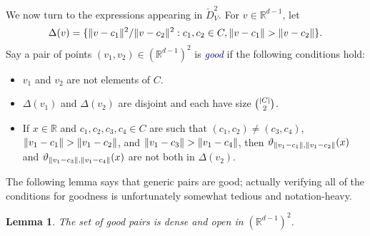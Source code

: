 \documentclass[11pt]{amsart}
\newtheorem{lemma}[theorem]{Lemma}
\theoremstyle{definition}
\DeclarePairedDelimiter{\set}{\{}{\}}
\DeclarePairedDelimiter{\abs}{\lvert}{\rvert}
\DeclarePairedDelimiter{\Abs}{\lVert}{\rVert}
\newcommand{\RR}{\mathbb{R}}
\newcommand{\dfn}[1]{\textcolor{darkblue}{\emph{#1}}}
\begin{document}
We now turn to the expressions appearing in $\check D^2_V$.  For $v \in \RR^{d-1}$, let \[\Delta(v) = \set{\Abs{v - c_1}^2/\Abs{v - c_2}^2 : c_1, c_2 \in C, \Abs{v - c_1} > \Abs{v - c_2}}.\] 
Say a pair of points $(v_1, v_2) \in (\RR^{d-1})^2$ is \dfn{good} if the following conditions hold:
\begin{itemize}
    \item $v_1$ and $v_2$ are not elements of $C$.
    \item $\Delta(v_1)$ and $\Delta(v_2)$ are disjoint and each have size $\binom{\abs{C}}{2}$.
    \item If $x \in \RR$ and $c_1, c_2, c_3, c_4 \in C$ are such that $(c_1,c_2) \neq (c_3,c_4)$, $\Abs{v_1 - c_1} > \Abs{v_1 - c_2}$, and $\Abs{v_1 - c_3} > \Abs{v_1 - c_4}$, then $\vartheta_{\Abs{v_1 - c_1},\Abs{v_1 - c_2}}(x)$ and $\vartheta_{\Abs{v_1 - c_3},\Abs{v_1 - c_4}}(x)$ are not both in $\Delta(v_2)$. 
\end{itemize}
The following lemma says that generic pairs are good; actually verifying all of the conditions for goodness is unfortunately somewhat tedious and notation-heavy.
\begin{lemma} \label{lem:denseopen}
The set of good pairs is dense and open in $(\RR^{d-1})^2$.
\end{lemma}
\end{document}

